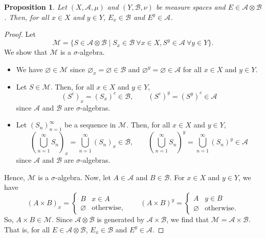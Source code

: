 \documentclass[a4paper, openany]{memoir}
\theoremstyle{definition}
\theoremstyle{plain}
\newtheorem{proposition}[definition]{Proposition}
\begin{document}
    \begin{proposition}
        Let $(X, \mathcal{A}, \mu)$ and $(Y, \mathcal{B}, \nu)$ be measure spaces and $E \in \mathcal{A} \otimes \mathcal{B}$. Then, for all $x \in X$ and $y \in Y$, $E_x \in \mathcal{B}$ and $E^y \in \mathcal{A}$.
    \end{proposition}
    \begin{proof}
        Let 
        \[\mathcal{M} = \{S \in \mathcal{A} \otimes \mathcal{B} \mid S_x \in \mathcal{B} \ \forall x \in X, S^y \in \mathcal{A} \ \forall y \in Y\}.\]
        We show that $\mathcal{M}$ is a $\sigma$-algebra.
        \begin{itemize}
            \item We have $\varnothing \in \mathcal{M}$ since $\varnothing_x = \varnothing \in \mathcal{B}$ and $\varnothing^y = \varnothing \in \mathcal{A}$ for all $x \in X$ and $y \in Y$.
            
            \item Let $S \in \mathcal{M}$. Then, for all $x \in X$ and $y \in Y$,
            \[(S^c)_x = (S_x)^c \in \mathcal{B}, \qquad (S^c)^y = (S^y)^c \in \mathcal{A}\]
            since $\mathcal{A}$ and $\mathcal{B}$ are $\sigma$-algebras.
            
            \item Let $(S_n)_{n=1}^\infty$ be a sequence in $\mathcal{M}$. Then, for all $x \in X$ and $y \in Y$,
            \[\left(\bigcup_{n=1}^\infty S_n\right)_x = \bigcup_{n=1}^\infty (S_n)_x \in \mathcal{B}, \qquad \left(\bigcup_{n=1}^\infty S_n\right)^y = \bigcup_{n=1}^\infty (S_n)^y \in \mathcal{A}\]
            since $\mathcal{A}$ and $\mathcal{B}$ are $\sigma$-algebras.
        \end{itemize}
        Hence, $\mathcal{M}$ is a $\sigma$-algebra. Now, let $A \in \mathcal{A}$ and $B \in \mathcal{B}$. For $x \in X$ and $y \in Y$, we have
        \[(A \times B)_x = \begin{cases}
            B & x \in A \\
            \varnothing & \textrm{otherwise},
        \end{cases} \qquad (A \times B)^y = \begin{cases}
            A & y \in B \\ 
            \varnothing & \textrm{otherwise}.
        \end{cases}\]
        So, $A \times B \in \mathcal{M}$. Since $\mathcal{A} \otimes \mathcal{B}$ is generated by $\mathcal{A} \times \mathcal{B}$, we find that $\mathcal{M} = \mathcal{A} \times \mathcal{B}$. That is, for all $E \in \mathcal{A} \otimes \mathcal{B}$, $E_x \in \mathcal{B}$ and $E^y \in \mathcal{A}$.
    \end{proof}
\end{document}

